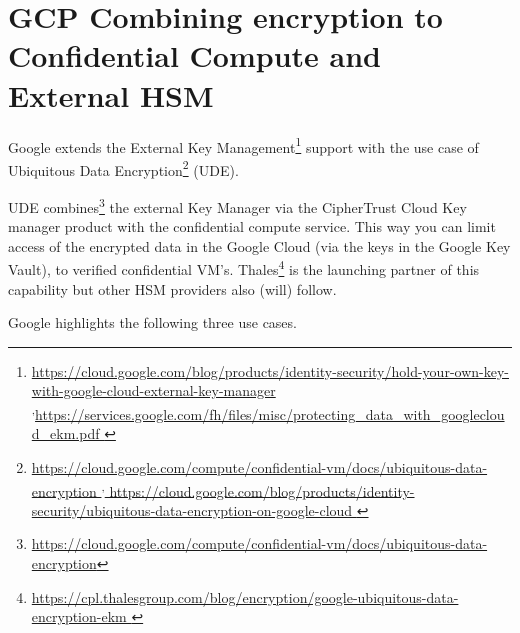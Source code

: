 
\section{GCP Combining encryption to Confidential Compute and External HSM}



Google extends the External Key Management\footnote{\url{https://cloud.google.com/blog/products/identity-security/hold-your-own-key-with-google-cloud-external-key-manager }\textsuperscript{,}\url{https://services.google.com/fh/files/misc/protecting_data_with_googlecloud_ekm.pdf }}
support with the use case of Ubiquitous Data Encryption\footnote{\url{ https://cloud.google.com/compute/confidential-vm/docs/ubiquitous-data-encryption }\textsuperscript{,}\url{ https://cloud.google.com/blog/products/identity-security/ubiquitous-data-encryption-on-google-cloud  }} (UDE).  

UDE combines\footnote{\url{ https://cloud.google.com/compute/confidential-vm/docs/ubiquitous-data-encryption}} the external Key Manager 
via the CipherTrust Cloud Key manager product 
with the confidential compute service. 
This way you can limit access of the encrypted data in the Google Cloud 
(via the keys in the Google Key Vault), 
to verified confidential VM’s. 
Thales\footnote{\url{https://cpl.thalesgroup.com/blog/encryption/google-ubiquitous-data-encryption-ekm }} 
is the launching partner of this capability 
but other HSM providers also (will) follow.

Google highlights the following three use cases.

